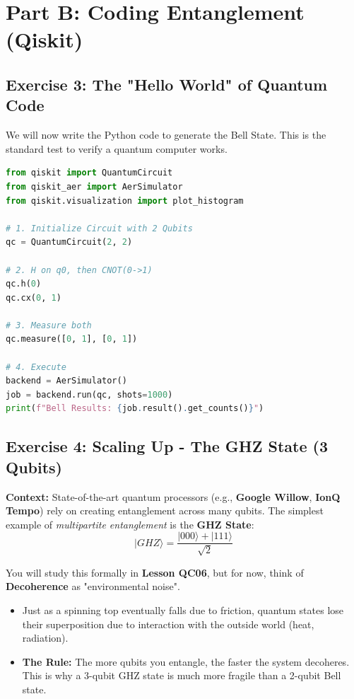 \documentclass[a4paper,11pt]{article}
\begin{document}
\newpage

\section{Part B: Coding Entanglement (Qiskit)}

\subsection{Exercise 3: The "Hello World" of Quantum Code}
We will now write the Python code to generate the Bell State. This is the standard test to verify a quantum computer works.

\begin{tcolorbox}[colback=green!5!white,colframe=green!75!black,title=Coding Task: Bell State]
\begin{lstlisting}[language=Python]
from qiskit import QuantumCircuit
from qiskit_aer import AerSimulator
from qiskit.visualization import plot_histogram

# 1. Initialize Circuit with 2 Qubits
qc = QuantumCircuit(2, 2)

# 2. H on q0, then CNOT(0->1)
qc.h(0)
qc.cx(0, 1)

# 3. Measure both
qc.measure([0, 1], [0, 1])

# 4. Execute
backend = AerSimulator()
job = backend.run(qc, shots=1000)
print(f"Bell Results: {job.result().get_counts()}")
\end{lstlisting}
\end{tcolorbox}

\subsection{Exercise 4: Scaling Up - The GHZ State (3 Qubits)}
\textbf{Context:} State-of-the-art quantum processors (e.g., \textbf{Google Willow}, \textbf{IonQ Tempo}) rely on creating entanglement across many qubits. The simplest example of \textit{multipartite entanglement} is the \textbf{GHZ State}:
\[ |GHZ\rangle = \frac{|000\rangle + |111\rangle}{\sqrt{2}} \]

\begin{tcolorbox}[colback=yellow!10!white,colframe=orange!80!black,title=Concept Preview: What is Decoherence?]
You will study this formally in \textbf{Lesson QC06}, but for now, think of \textbf{Decoherence} as "environmental noise".
\begin{itemize}
    \item Just as a spinning top eventually falls due to friction, quantum states lose their superposition due to interaction with the outside world (heat, radiation).
    \item \textbf{The Rule:} The more qubits you entangle, the faster the system decoheres. This is why a 3-qubit GHZ state is much more fragile than a 2-qubit Bell state.
\end{itemize}
\end{tcolorbox}
\end{document}

